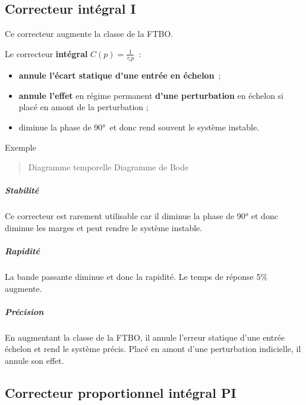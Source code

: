 \hypertarget{correcteur-intuxe9gral-i}{%
\subsection{Correcteur intégral I}\label{correcteur-intuxe9gral-i}}

Ce correcteur augmente la classe de la FTBO.

Le correcteur \textbf{intégral} \(C(p) = \frac{1}{\tau_{i}p}\)~:

\begin{itemize}
\item
  \textbf{annule l'écart statique d'une entrée en échelon}~;
\item
  \textbf{annule l'effet} en régime permanent \textbf{d'une perturbation} en échelon si placé en amont de la perturbation ;
\item
  diminue la phase de 90°~et donc rend souvent le système instable.
\end{itemize}

Exemple

\begin{quote}
Diagramme temporelle Diagramme de Bode
\end{quote}

\hypertarget{stabilituxe9-1}{%
\subparagraph*{Stabilité}\label{stabilituxe9-1}}

Ce correcteur est rarement utilisable car il diminue la phase de 90° et donc diminue les marges et peut rendre le système instable.

\hypertarget{rapidituxe9-1}{%
\subparagraph*{Rapidité}\label{rapidituxe9-1}}

La bande passante diminue et donc la rapidité. Le temps de réponse 5\% augmente.

\hypertarget{pruxe9cision-1}{%
\subparagraph*{Précision}\label{pruxe9cision-1}}

En augmentant la classe de la FTBO, il annule l'erreur statique d'une entrée échelon et rend le système précis. Placé en amont d'une perturbation indicielle, il annule son effet.

\hypertarget{correcteur-proportionnel-intuxe9gral-pi}{%
\subsection{Correcteur proportionnel intégral PI}\label{correcteur-proportionnel-intuxe9gral-pi}}

